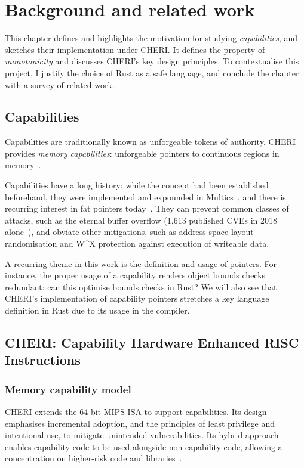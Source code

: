 \documentclass[dissertation.tex]{subfiles}
\begin{document}
\chapter{Background and related work}
\label{ch:bg}


This chapter defines and highlights the motivation for studying
\emph{capabilities}, and sketches their implementation under CHERI.
It defines the property of \emph{monotonicity} and discusses CHERI's key
design principles.
To contextualise this project, I justify the choice of Rust as a safe
language, and conclude the chapter with a survey of related work.


\section{Capabilities}
\label{sec:bg-caps}
Capabilities are traditionally known as unforgeable tokens of authority.
CHERI provides \emph{memory capabilities}: unforgeable pointers to
continuous regions in memory~\cite{cheri-risc-2014}.

Capabilities have a long history: while the concept had been established
beforehand, they were implemented and expounded in
Multics~\cite{bell-lapadula}, and there is recurring interest in fat
pointers today~\cite{devietti-hardbound,lowfat-kwon}.
They can prevent common classes of attacks, such as the
eternal buffer overflow (1,613 published CVEs in 2018
alone~\cite{nist-nvd-overflow-2018}), and obviate other mitigations,
such as address-space layout randomisation and W\^{}X protection
against execution of writeable data.

A recurring theme in this work is the definition and usage of pointers.
For instance, the proper usage of a capability renders object bounds
checks redundant: can this optimise bounds checks in Rust?
We will also see that CHERI's implementation of capability pointers
stretches a key language definition in Rust due to its usage in the
compiler.


\section{CHERI: Capability Hardware Enhanced RISC Instructions}

\subsection{Memory capability model}

CHERI extends the 64-bit MIPS ISA to support capabilities.
Its design emphasises incremental adoption, and the principles of least
privilege and intentional use, to mitigate unintended vulnerabilities.
Its hybrid approach enables capability code to be used alongside
non-capability code, allowing a concentration on higher-risk code and
libraries~\cite{cheri-v6}.
\end{document}
